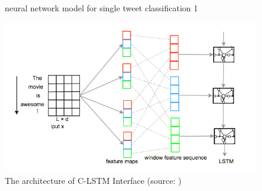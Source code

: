 \begin{figure}[]
{}
\caption{neural network model for single tweet classification 1}
\label{fig:NNModel1}
\end{figure}

  \begin{figure}
\centering
\includegraphics[width=0.8\columnwidth]{images/CNNLSTMdetail.png}
\caption{The architecture of C-LSTM Interface (source: \cite{zhou2015c})}
\label{fig:CNNLSTMde}
\end{figure} 


